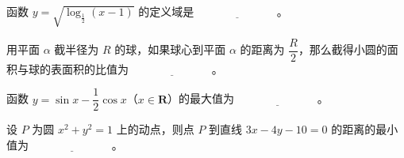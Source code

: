 \begin{question}
函数 $y=\sqrt{\log_{\frac{1}{2}}(x-1)}$ 的定义域是 $\underline{\hspace{3cm}}$。

\end{question}
\begin{question}
用平面 $\alpha$ 截半径为 $R$ 的球，如果球心到平面 $\alpha$ 的距离为 $\dfrac{R}{2}$，那么截得小圆的面积与球的表面积的比值为 $\underline{\hspace{3cm}}$。

\end{question}
\begin{question}
函数 $y=\sin x-\dfrac{1}{2}\cos x$（$x\in\mathbf{R}$）的最大值为 $\underline{\hspace{3cm}}$。

\end{question}
\begin{question}
设 $P$ 为圆 $x^2+y^2=1$ 上的动点，则点 $P$ 到直线 $3x-4y-10=0$ 的距离的最小值为 $\underline{\hspace{3cm}}$。

\end{question}

